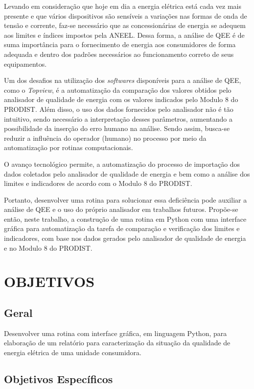 Levando em consideração que hoje em dia a energia elétrica está cada vez mais presente e que vários dispositivos são sensíveis a variações nas formas de onda de tensão e corrente, faz-se necessário que as concessionárias de energia se adequem aos limites e índices impostos pela ANEEL. Dessa forma, a análise de QEE é de suma importância para o fornecimento de energia aos consumidores de forma adequada e dentro dos padrões necessários ao funcionamento correto de seus equipamentos.

Um dos desafios na utilização dos \textit{softwares} disponíveis para a análise de QEE, como o \textit{Topview}, é a automatização da comparação dos valores obtidos pelo analisador de qualidade de energia com os valores indicados pelo Modulo 8 do PRODIST. Além disso, o uso dos dados fornecidos pelo analisador não é tão intuitivo, sendo necessário a interpretação desses parâmetros, aumentando a possibilidade da inserção do erro humano na análise. Sendo assim, busca-se reduzir a influência do operador (humano) no processo por meio da automatização por rotinas computacionais.

O avanço tecnológico permite, a automatização do processo de importação dos dados coletados pelo analisador de qualidade de energia e bem como a análise dos limites e indicadores de acordo com o Modulo 8 do PRODIST.

Portanto, desenvolver uma rotina para solucionar essa deficiência pode auxiliar a análise de QEE e o uso do próprio analisador em trabalhos futuros. Propõe-se então, neste trabalho, a construção de uma rotina em Python com uma interface gráfica para automatização da tarefa de comparação e verificação dos limites e indicadores, com base nos dados gerados pelo analisador de qualidade de energia e no Modulo 8 do PRODIST.

\section{OBJETIVOS}

\subsection{Geral}

Desenvolver uma rotina com interface gráfica, em linguagem Python, para elaboração de um relatório para caracterização da situação da qualidade de energia elétrica de uma unidade consumidora.

\subsection{Objetivos Específicos}

